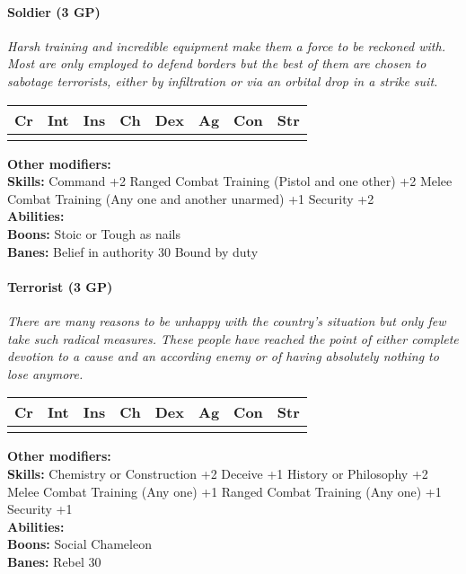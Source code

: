 \documentclass[12pt,a4paper,openany]{book}
\begin{document}
	\paragraph*{Soldier (3 GP)}
	\textit{Harsh training and incredible equipment make them a force to be reckoned with. Most are only employed to defend borders but the best of them are chosen to sabotage terrorists, either by infiltration or via an orbital drop in a strike suit.}\par
	\begin{tabular}{|l|l|l|l|l|l|l|l|}
		\hline
		Cr & Int & Ins & Ch & Dex & Ag & Con & Str \\ \hline
		&  &  &  &  &  &  &  \\ \hline
	\end{tabular}\par
	\noindent\textbf{Other modifiers:} \\
	\textbf{Skills:} Command +2
	Ranged Combat Training (Pistol and one other) +2
	Melee Combat Training (Any one and another unarmed) +1
	Security +2\\
	\textbf{Abilities:} \\
	\textbf{Boons:} Stoic or Tough as nails\\
	\textbf{Banes:} Belief in authority 30
	Bound by duty\\
	
	\hrulefill
	\paragraph*{Terrorist (3 GP)}
	\textit{There are many reasons to be unhappy with the country's situation but only few take such radical measures. These people have reached the point of either complete devotion to a cause and an according enemy or of having absolutely nothing to lose anymore.}\par
	\begin{tabular}{|l|l|l|l|l|l|l|l|}
		\hline
		Cr & Int & Ins & Ch & Dex & Ag & Con & Str \\ \hline
		&  &  &  &  &  &  &  \\ \hline
	\end{tabular}\par
	\noindent\textbf{Other modifiers:} \\
	\textbf{Skills:} Chemistry or Construction +2
	Deceive +1
	History or Philosophy +2
	Melee Combat Training (Any one) +1
	Ranged Combat Training (Any one) +1
	Security +1\\
	\textbf{Abilities:} \\
	\textbf{Boons:} Social Chameleon\\
	\textbf{Banes:} Rebel 30\\
	
\end{document}
